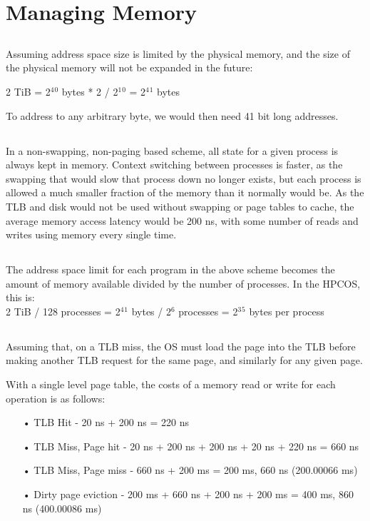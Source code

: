 \documentclass{article}
\begin{document}
\setcounter{section}{4}
\setcounter{subsection}{0}
\section*{Managing Memory}
\subsection{}
Assuming address space size is limited by the physical memory, and the size of the physical memory will not be expanded in the future:

2 TiB = 2$^4$$^0$ bytes * 2 / 2$^1$$^0$ = 2$^4$$^1$ bytes

To address to any arbitrary byte, we would then need 41 bit long addresses.

\subsection{}
In a non-swapping, non-paging based scheme, all state for a given process is always kept in memory. Context switching between processes is faster, as the swapping that would slow that process down no longer exists, but each process is allowed a much smaller fraction of the memory than it normally would be.
As the TLB and disk would not be used without swapping or page tables to cache, the average memory access latency would be 200 ns, with some number of reads and writes using memory every single time.

\subsection{}
The address space limit for each program in the above scheme becomes the amount of memory available divided by the number of processes. In the HPCOS, this is:\\
2 TiB / 128 processes = 2$^4$$^1$ bytes / 2$^6$ processes = 2$^3$$^5$ bytes per process

\subsection{}
Assuming that, on a TLB miss, the OS must load the page into the TLB before making another TLB request for the same page, and similarly for any given page.

With a single level page table, the costs of a memory read or write for each operation is as follows:
\begin{itemize}
\item[•] TLB Hit - 20 ns + 200 ns = 220 ns
\item[•] TLB Miss, Page hit - 20 ns + 200 ns + 200 ns + 20 ns + 220 ns = 660 ns
\item[•] TLB Miss, Page miss - 660 ns + 200 ms = 200 ms, 660 ns (200.00066 ms)
\item[•] Dirty page eviction - 200 ms + 660 ns + 200 ns + 200 ms = 400 ms, 860 ns (400.00086 ms)
\end{itemize}
\end{document}
